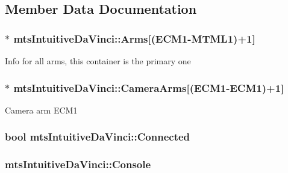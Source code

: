 \subsection{Member Data Documentation}
\hypertarget{classmts_intuitive_da_vinci_a66c7aafdf43dc2172bc4b7e7e880046a}{
\subsubsection[{Arms}]{$\ast$ mts\-Intuitive\-Da\-Vinci\-::\-Arms\mbox{[}({\bf E\-C\-M1}-\/{\bf M\-T\-M\-L1})+1\mbox{]}\hspace{0.3cm}{\ttfamily [protected]}}}\label{classmts_intuitive_da_vinci_a66c7aafdf43dc2172bc4b7e7e880046a}
Info for all arms, this container is the primary one \hypertarget{classmts_intuitive_da_vinci_a3b0838b5bce0e66ac94c4e9425f55001}{
\subsubsection[{Camera\-Arms}]{$\ast$ mts\-Intuitive\-Da\-Vinci\-::\-Camera\-Arms\mbox{[}({\bf E\-C\-M1}-\/{\bf E\-C\-M1})+1\mbox{]}\hspace{0.3cm}{\ttfamily [protected]}}}\label{classmts_intuitive_da_vinci_a3b0838b5bce0e66ac94c4e9425f55001}
Camera arm E\-C\-M1 \hypertarget{classmts_intuitive_da_vinci_a92486c3be7e1f07ef72df2f00556a5c7}{
\subsubsection[{Connected}]{\setlength{\rightskip}{0pt plus 5cm}bool mts\-Intuitive\-Da\-Vinci\-::\-Connected\hspace{0.3cm}{\ttfamily [protected]}}}\label{classmts_intuitive_da_vinci_a92486c3be7e1f07ef72df2f00556a5c7}
\hypertarget{classmts_intuitive_da_vinci_a653cc20fc11e9d3717a825fa1d4bebb7}{
\subsubsection[{Console}]{ mts\-Intuitive\-Da\-Vinci\-::\-Console\hspace{0.3cm}{\ttfamily [protected]}}}\label{classmts_intuitive_da_vinci_a653cc20fc11e9d3717a825fa1d4bebb7}
